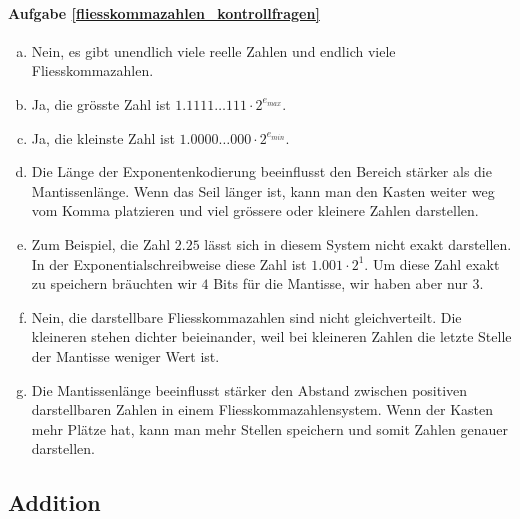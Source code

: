 \paragraph{Aufgabe \ref{fliesskommazahlen_kontrollfragen}}
\begin{enumerate}[(a)]
\item Nein, es gibt unendlich viele reelle Zahlen und endlich viele Fliesskommazahlen.
\item Ja, die grösste Zahl ist \(1.1111 \ldots 111 \cdot 2^{e_{max}}\).
\item Ja, die kleinste Zahl ist \(1.0000 \ldots 000 \cdot 2^{e_{min}}\).
\item Die Länge der Exponentenkodierung beeinflusst den Bereich stärker als die Mantissenlänge. Wenn das Seil länger ist, kann man den Kasten weiter weg vom Komma platzieren und viel grössere oder kleinere Zahlen darstellen.
\item Zum Beispiel, die Zahl \(2.25\) lässt sich in diesem System nicht exakt darstellen. In der Exponentialschreibweise diese Zahl ist \(1.001 \cdot 2^{1}\). Um diese Zahl exakt zu speichern bräuchten wir \(4\) Bits für die Mantisse, wir haben aber nur \(3\).
\item Nein, die darstellbare Fliesskommazahlen sind nicht gleichverteilt. Die kleineren stehen dichter beieinander, weil bei kleineren Zahlen die letzte Stelle der Mantisse weniger Wert ist.
\item Die Mantissenlänge beeinflusst stärker den Abstand zwischen positiven darstellbaren Zahlen in einem Fliesskommazahlensystem. Wenn der Kasten mehr Plätze hat, kann man mehr Stellen speichern und somit Zahlen genauer darstellen.
\end{enumerate}


\subsection{Addition}
